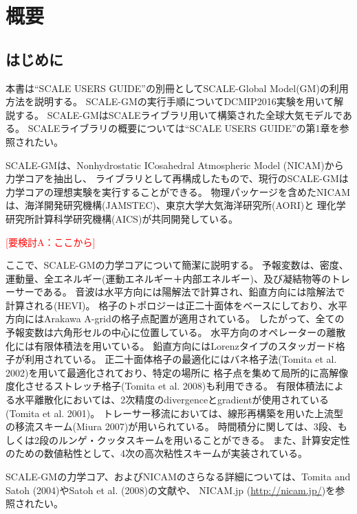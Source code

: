 \section{概要}

\subsection{はじめに}

本書は``SCALE USERS GUIDE''の別冊としてSCALE-Global Model(GM)の利用方法を説明する。
SCALE-GMの実行手順についてDCMIP2016実験を用いて解説する。
SCALE-GMはSCALEライブラリ用いて構築された全球大気モデルである。
SCALEライブラリの概要については``SCALE USERS GUIDE''の第1章を参照されたい。


SCALE-GMは、Nonhydrostatic ICosahedral Atmospheric Model (NICAM)から力学コアを抽出し、
ライブラリとして再構成したもので、現行のSCALE-GMは力学コアの理想実験を実行することができる。
物理パッケージを含めたNICAMは、海洋開発研究機構(JAMSTEC)、東京大学大気海洋研究所(AORI)と
理化学研究所計算科学研究機構(AICS)が共同開発している。


\textcolor{red}{[要検討A：ここから]}

ここで、SCALE-GMの力学コアについて簡潔に説明する。
予報変数は、密度、運動量、全エネルギー(運動エネルギー＋内部エネルギー)、及び凝結物等のトレーサーである。
音波は水平方向には陽解法で計算され、鉛直方向には陰解法で計算される(HEVI)。
格子のトポロジーは正二十面体をベースにしており、水平方向にはArakawa A-gridの格子点配置が適用されている。
したがって、全ての予報変数は六角形セルの中心に位置している。
水平方向のオペレーターの離散化には有限体積法を用いている。
鉛直方向にはLorenzタイプのスタッガード格子が利用されている。
正二十面体格子の最適化にはバネ格子法(Tomita et al. 2002)を用いて最適化されており、特定の場所に
格子点を集めて局所的に高解像度化させるストレッチ格子(Tomita et al. 2008)も利用できる。
有限体積法による水平離散化においては、2次精度のdivergenceとgradientが使用されている(Tomita et al. 2001)。
トレーサー移流においては、線形再構築を用いた上流型の移流スキーム(Miura 2007)が用いられている。
時間積分に関しては、3段、もしくは2段のルンゲ・クッタスキームを用いることができる。
また、計算安定性のための数値粘性として、4次の高次粘性スキームが実装されている。

SCALE-GMの力学コア、およびNICAMのさらなる詳細については、Tomita and Satoh (2004)やSatoh et al. (2008)の文献や、
NICAM.jp (\url{http://nicam.jp/})を参照されたい。

